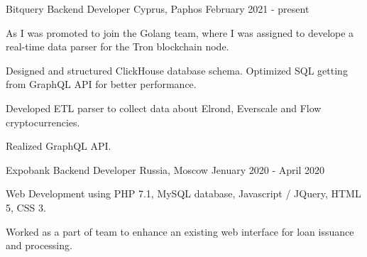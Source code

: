

\begin{cventries}

  \cventry
    {Bitquery} %
    {Backend Developer} %
    {Cyprus, Paphos} %
    {February 2021 - present} %
    {
      \begin{cvitems} %
        \item {
          As I was promoted to join the Golang team, where I was assigned to 
          develope a real-time data parser for the Tron blockchain node.
        }
        \item {
          Designed and structured ClickHouse database schema. Optimized SQL getting from GraphQL API for better performance.
        }
        \item {
          Developed ETL parser to collect data about Elrond, Everscale and Flow cryptocurrencies.
        }
        \item {
          Realized GraphQL API.
        }
      \end{cvitems}
  }

  \cventry
    {Expobank} %
    {Backend Developer} %
    {Russia, Moscow} %
    {Jenuary 2020 - April 2020} %
    {
      \begin{cvitems} %
        \item {Web Development using PHP 7.1, MySQL database, Javascript / JQuery, HTML 5, CSS 3.}
        \item {Worked as a part of team to enhance an existing web interface for loan issuance and processing.}
      \end{cvitems}
  }

\end{cventries}
